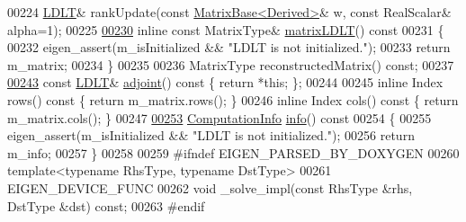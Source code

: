 \begin{DoxyCode}
00224     \hyperlink{group___cholesky___module_class_eigen_1_1_l_d_l_t}{LDLT}& rankUpdate(\textcolor{keyword}{const} \hyperlink{group___core___module_class_eigen_1_1_matrix_base}{MatrixBase<Derived>}& w, \textcolor{keyword}{const} RealScalar& alpha=1);
00225 
\hyperlink{group___cholesky___module_aa5e0fd09dcd5251a8521fa248b95db0b}{00230}     \textcolor{keyword}{inline} \textcolor{keyword}{const} MatrixType& \hyperlink{group___cholesky___module_aa5e0fd09dcd5251a8521fa248b95db0b}{matrixLDLT}()\textcolor{keyword}{ const}
00231 \textcolor{keyword}{    }\{
00232       eigen\_assert(m\_isInitialized && \textcolor{stringliteral}{"LDLT is not initialized."});
00233       \textcolor{keywordflow}{return} m\_matrix;
00234     \}
00235 
00236     MatrixType reconstructedMatrix() \textcolor{keyword}{const};
00237 
\hyperlink{group___cholesky___module_ac656a209860fa0c6a8faa8bb9f9a06ef}{00243}     \textcolor{keyword}{const} \hyperlink{group___cholesky___module_class_eigen_1_1_l_d_l_t}{LDLT}& \hyperlink{group___cholesky___module_ac656a209860fa0c6a8faa8bb9f9a06ef}{adjoint}()\textcolor{keyword}{ const }\{ \textcolor{keywordflow}{return} *\textcolor{keyword}{this}; \};
00244 
00245     \textcolor{keyword}{inline} Index rows()\textcolor{keyword}{ const }\{ \textcolor{keywordflow}{return} m\_matrix.rows(); \}
00246     \textcolor{keyword}{inline} Index cols()\textcolor{keyword}{ const }\{ \textcolor{keywordflow}{return} m\_matrix.cols(); \}
00247 
\hyperlink{group___cholesky___module_a6bd6008501a537d2e16ea672a853bf3e}{00253}     \hyperlink{group__enums_ga85fad7b87587764e5cf6b513a9e0ee5e}{ComputationInfo} \hyperlink{group___cholesky___module_a6bd6008501a537d2e16ea672a853bf3e}{info}()\textcolor{keyword}{ const}
00254 \textcolor{keyword}{    }\{
00255       eigen\_assert(m\_isInitialized && \textcolor{stringliteral}{"LDLT is not initialized."});
00256       \textcolor{keywordflow}{return} m\_info;
00257     \}
00258 
00259 \textcolor{preprocessor}{    #ifndef EIGEN\_PARSED\_BY\_DOXYGEN}
00260     \textcolor{keyword}{template}<\textcolor{keyword}{typename} RhsType, \textcolor{keyword}{typename} DstType>
00261     EIGEN\_DEVICE\_FUNC
00262     \textcolor{keywordtype}{void} \_solve\_impl(\textcolor{keyword}{const} RhsType &rhs, DstType &dst) \textcolor{keyword}{const};
00263 \textcolor{preprocessor}{    #endif}

\end{DoxyCode}
